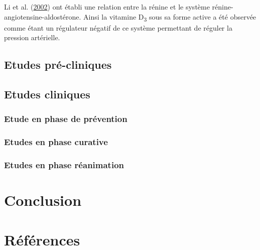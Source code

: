 \documentclass[
  a4paper,
  DIV=11,
  numbers=noendperiod,
  listof=totoc]{scrreprt}
\begin{document}
Li et al. (\protect\hyperlink{ref-Li.2002}{2002}) ont établi une
relation entre la rénine et le système rénine-angiotensine-aldostérone.
Ainsi la vitamine D\textsubscript{3} sous sa forme active a été observée
comme étant un régulateur négatif de ce système permettant de réguler la
pression artérielle.

\hypertarget{etudes-pruxe9-cliniques}{%
\section{Etudes pré-cliniques}\label{etudes-pruxe9-cliniques}}

\hypertarget{etudes-cliniques}{%
\section{Etudes cliniques}\label{etudes-cliniques}}

\hypertarget{etude-en-phase-de-pruxe9vention}{%
\subsection{Etude en phase de
prévention}\label{etude-en-phase-de-pruxe9vention}}

\hypertarget{etudes-en-phase-curative}{%
\subsection{Etudes en phase curative}\label{etudes-en-phase-curative}}

\hypertarget{etudes-en-phase-ruxe9animation}{%
\subsection{Etudes en phase
réanimation}\label{etudes-en-phase-ruxe9animation}}

\newpage{}

\hypertarget{conclusion}{%
\chapter{Conclusion}\label{conclusion}}

\newpage{}

\hypertarget{ruxe9fuxe9rences}{%
\chapter*{Références}\label{ruxe9fuxe9rences}}
\end{document}

